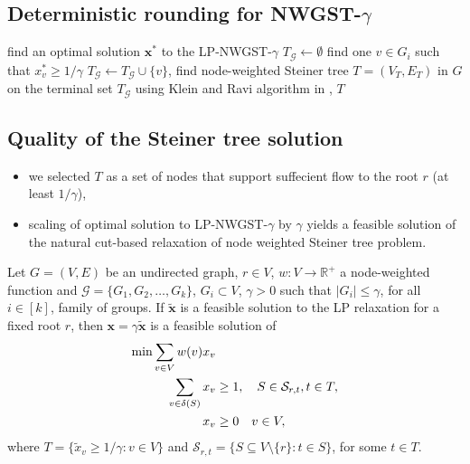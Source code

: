 \documentclass{beamer}
\begin{document}
\subsection*{Deterministic rounding for NWGST-$\gamma$}

\begin{frame}{\insertsection}{\insertsubsection}
    \begin{algorithmic}[1]
           \State find an optimal solution $\mathbf{x}^\ast$ to the LP-NWGST-$\gamma$
           \State $T_\mathcal{G}\gets\emptyset$
                \State 	find one $v\in G_i$ such that $x_v^\ast\geq 1/\gamma$
                \State $T_\mathcal{G}\gets T_\mathcal{G}\cup\{v\}$,
           \EndFor
           \State find node-weighted Steiner tree $T=\left(V_T,E_T\right)$ in $G$ on the terminal set $T_\mathcal{G}$ using Klein and Ravi algorithm in \autocite{kleinNearlyBestPossibleApproximation1995},
           \State \Return $T$
        \EndProcedure
        \end{algorithmic}
\end{frame}

\subsection*{Quality of the Steiner tree solution}

\begin{frame}{\insertsection}{\insertsubsection}
\begin{itemize}
    \item we selected $T$ as a set of nodes that support suffecient flow to the root $r$ (at least $1/\gamma$),
    \item scaling of \alert{optimal solution} to LP-NWGST-$\gamma$ by $\gamma$ yields a \alert{feasible solution} of the natural cut-based relaxation of node weighted Steiner tree problem.
\end{itemize}
\end{frame}
\begin{frame}{\insertsection}{\insertsubsection}
    \begin{lemma}{}
        Let $G=\left(V,E\right)$ be an undirected graph, $r\in V$, $w:V\rightarrow\mathbb{R}^+$ a node-weighted function and $\mathcal{G}=\{G_1,G_2,\ldots,G_k\}$, $G_i\subset V$, $\gamma>0$ such that $\left|G_i\right|\le\gamma$, for all $i\in\left[k\right]$, family of groups. If $\widetilde{\mathbf{x}}$ is a feasible solution to the LP relaxation for a fixed root $r$, then $\mathbf{x}=\gamma\widetilde{\mathbf{x}}$ is a feasible solution of
        \begin{align*}
            \mbox{min} \sum_{v\in V}w(v)x_v&\notag\\
            \sum_{v\in \delta(S)} x_v  &\geq 1, \quad S\in \mathcal{S}_{r,t}, t\in T,\\
            x_v & \geq 0 \quad v\in V,
        \end{align*}
        where $T=\{\widetilde{x}_v\geq 1/\gamma:v\in V\}$ and $\mathcal{S}_{r,t}=\{S\subseteq V\setminus\{r\}:t\in S\}$, for some $t\in T$.
    \end{lemma}
\end{frame}
\end{document}
